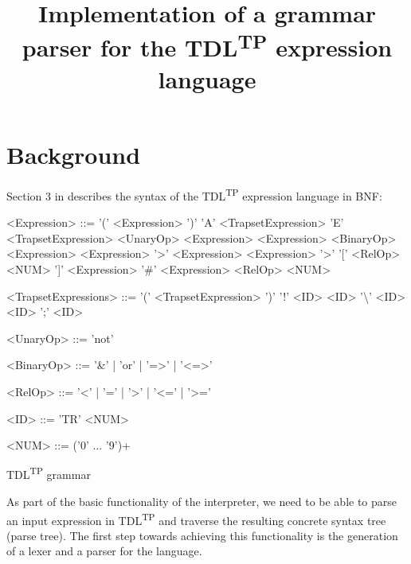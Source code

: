 \documentclass[12pt,oneside,a4paper,notitlepage]{report}
\title{
	Implementation of a grammar parser for the TDL\textsuperscript{TP} expression language
}
\newcommand{\texttilde}{\raisebox{0.5ex}{\texttildelow}}
\begin{document}
	\maketitle

	\section*{Background}
	\par Section 3 in \cite{tdlarticle} describes the syntax of the TDL\textsuperscript{TP} expression language in BNF:

	\begin{GrammarWrapper}
		\begin{grammar}
		<Expression>	::=	'(' <Expression> ')'
		\alt 				'A' <TrapsetExpression>
		\alt 				'E' <TrapsetExpression>
		\alt 				<UnaryOp> <Expression>
		\alt 				<Expression> <BinaryOp> <Expression>
		\alt 				<Expression> '\texttilde\textgreater' <Expression>
		\alt 				<Expression> '\texttilde\textgreater' '[' <RelOp> <NUM> ']' <Expression>
		\alt 				'\#' <Expression> <RelOp> <NUM>
		
		<TrapsetExpressions>	::=	'(' <TrapsetExpression> ')'
		\alt						'!' <ID>
		\alt 						<ID> '\textbackslash' <ID>
		\alt						<ID> ';' <ID>
		
		<UnaryOp>	::= 'not'
		
		<BinaryOp>	::= '\&' | 'or' | '=\textgreater' | '\textless=\textgreater'
		
		<RelOp> 	::= '\textless' | '=' | '\textgreater' | '\textless=' | '\textgreater='
		
		<ID> 		::= 'TR' <NUM>
		
		<NUM> 		::= ('0' ... '9')+
		\end{grammar}
		\caption{TDL\textsuperscript{TP} grammar}\label{bnf:original}
	\end{GrammarWrapper}

	As part of the basic functionality of the interpreter, we need to be able to parse an input expression in TDL\textsuperscript{TP} and traverse the resulting concrete syntax tree (parse tree). The first step towards achieving this functionality is the generation of a lexer and a parser for the language. 
\end{document}
